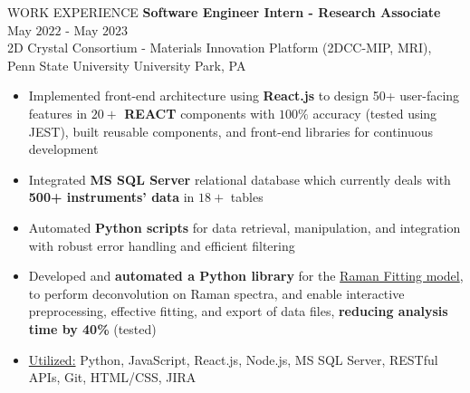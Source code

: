 \documentclass{resume} %
\begin{document}
\begin{rSection}{WORK EXPERIENCE}
{\bf Software Engineer Intern - Research Associate} \hfill May $2022$ - May $2023$\\
2D Crystal Consortium - Materials Innovation Platform (2DCC-MIP, MRI), Penn State University \hfill University Park, PA
\begin{itemize}[itemsep = -4pt]
    \item Implemented front-end architecture using {\bf React.js} to design 50+ user-facing features in {\bf $20+$ REACT} components with $100\%$ accuracy (tested using JEST), built reusable components, and front-end libraries for continuous development
    \item Integrated {\bf MS SQL Server} relational database which currently deals with {\bf 500+ instruments' data} in $18+$ tables
    \item Automated {\bf Python scripts} for data retrieval, manipulation, and integration with robust error handling and efficient filtering
    \item Developed and {\bf automated a Python library} for the {\href{https://github.com/harshitjain17/Raman-Peak-Fitting-Model/}{Raman Fitting model}}, to perform deconvolution on Raman spectra, and enable interactive preprocessing, effective fitting, and export of data files, {\bf reducing analysis time by 40\%} (tested)
    \item \underline{Utilized:} Python, JavaScript, React.js, Node.js, MS SQL Server, RESTful APIs, Git, HTML/CSS, JIRA
\end{itemize}

\end{rSection} 


\end{document}
